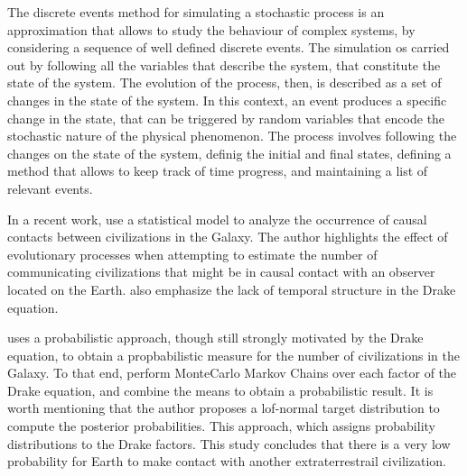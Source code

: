 \documentclass[crop]{CSLB}
\begin{document}
The discrete events method for simulating a stochastic process is an
approximation that allows to study the behaviour of complex
systems, by considering a sequence of well defined discrete events.
%
The simulation os carried out by following all the variables that
describe the system, that constitute the state of the system.
%
The evolution of the process, then, is described as a set of changes
in the state of the system.
%
In this context, an event produces a specific change in the state,
that can be triggered by random variables that encode the stochastic
nature of the physical phenomenon.
%
The process involves following the changes on the state of the system,
definig the initial and final states, defining a method that allows to
keep track of time progress, and maintaining a list of relevant
events.


In a recent work, \citep{balbi_impact_2018} use a statistical model to analyze
the occurrence of causal contacts between civilizations in the Galaxy.
%
The author highlights the effect of evolutionary processes when
attempting to estimate the number of communicating civilizations that
might be in causal contact with an observer located on the Earth.
%
\citet{cirkovic_temporal_2004} also emphasize the lack of temporal
structure in the Drake equation.





\citet{bloetscher_using_2019} uses a probabilistic approach, though
still strongly motivated by the Drake equation, to obtain a
propbabilistic measure for the number of civilizations in the Galaxy.
To that end, perform MonteCarlo Markov Chains over each factor of the
Drake equation, and combine the means to obtain a probabilistic
result. It is worth mentioning that the author proposes a lof-normal
target distribution to compute the posterior probabilities. This
approach, which assigns probability distributions to the Drake
factors. This study concludes that there is a very low probability for
Earth to make contact with another extraterrestrail civilization.    
\end{document}
